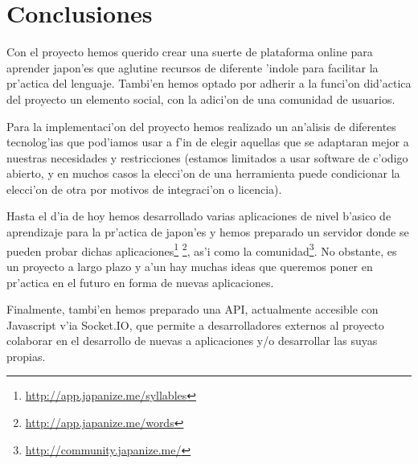 \section{Conclusiones}
\label{sec:conclusiones}

Con el proyecto \Nipponline{} hemos querido crear una suerte de plataforma online para aprender japon'es que aglutine 
recursos de diferente 'indole para facilitar la pr'actica del lenguaje. Tambi'en hemos optado por adherir a la funci'on 
did'actica del proyecto un elemento social, con la adici'on de una comunidad de usuarios.

Para la implementaci'on del proyecto hemos realizado un an'alisis de diferentes tecnolog'ias que pod'iamos usar a f'in de 
elegir aquellas que se adaptaran mejor a nuestras necesidades y restricciones (estamos limitados a usar software de 
c'odigo abierto, y en muchos casos la elecci'on de una herramienta puede condicionar la elecci'on de otra por motivos de 
integraci'on o licencia).

Hasta el d'ia de hoy hemos desarrollado varias aplicaciones de nivel b'asico de aprendizaje para la pr'actica de japon'es y 
hemos preparado un servidor donde se pueden probar dichas 
aplicaciones\footnote{\url{http://app.japanize.me/syllables}} \footnote{\url{http://app.japanize.me/words}}, as'i como 
la comunidad\footnote{\url{http://community.japanize.me/}}. No obstante, \Nipponline{} es un proyecto a largo plazo y 
a'un hay muchas ideas que queremos poner en pr'actica en el futuro en forma de nuevas aplicaciones.

Finalmente, tambi'en hemos preparado una API, actualmente accesible con Javascript v'ia Socket.IO, que permite a 
desarrolladores externos al proyecto colaborar en el desarrollo de nuevas a aplicaciones y/o desarrollar las suyas 
propias.
